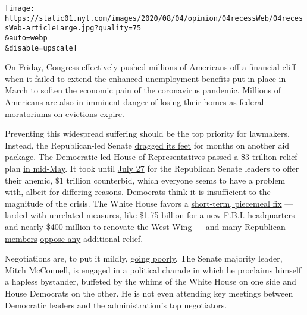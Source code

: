 \texttt{[image: https://static01.nyt.com/images/2020/08/04/opinion/04recessWeb/04recessWeb-articleLarge.jpg?quality=75\\\&auto=webp\\\&disable=upscale]}

On Friday, Congress effectively pushed millions of Americans off a
financial cliff when it failed to extend the enhanced unemployment
benefits put in place in March to soften the economic pain of the
coronavirus pandemic. Millions of Americans are also in imminent danger
of losing their homes as federal moratoriums on
\href{https://www.nytimes.com/2020/07/23/opinion/coronavirus-evictions-rent.html}{evictions
expire}.

Preventing this widespread suffering should be the top priority for
lawmakers. Instead, the Republican-led Senate
\href{https://www.nytimes.com/2020/07/30/opinion/mitch-mcconnell-coronavirus-economy.html}{dragged
its feet} for months on another aid package. The Democratic-led House of
Representatives passed a \$3 trillion relief plan
\href{https://www.nytimes.com/2020/05/15/us/politics/house-simulus-vote.html}{in
mid-May}. It took until
\href{https://www.nytimes.com/reuters/2020/07/27/us/politics/27reuters-health-coronavirus-usa-legislation-factbox.html}{July
27} for the Republican Senate leaders to offer their anemic, \$1
trillion counterbid, which everyone seems to have a problem with, albeit
for differing reasons. Democrats think it is insufficient to the
magnitude of the crisis. The White House favors a
\href{https://www.nytimes.com/2020/07/29/business/economy/virus-aid-trump.html}{short-term,
piecemeal fix} --- larded with unrelated measures, like \$1.75 billion
for a new F.B.I. headquarters and nearly \$400 million to
\href{https://abcnews.go.com/Politics/wireStory/administration-west-wing-remodel-money-virus-bill-72061451}{renovate
the West Wing} --- and
\href{https://www.nytimes.com/2020/07/28/us/politics/coronavirus-relief-bills-house-senate.html}{many
Republican members}
\href{https://www.forbes.com/sites/zackfriedman/2020/07/29/stimulus-package-republicans/\#4ec4dffa1164}{oppose
any} additional relief.

Negotiations are, to put it mildly,
\href{https://www.politico.com/news/2020/08/03/senate-faces-crucial-week-on-coronavirus-relief-talks-390907?nname=playbook\&nid=0000014f-1646-d88f-a1cf-5f46b7bd0000\&nrid=0000014e-f10f-dd93-ad7f-f90fe5eb0000\&nlid=630318}{going
poorly}. The Senate majority leader, Mitch McConnell, is engaged in a
political charade in which he proclaims himself a hapless bystander,
buffeted by the whims of the White House on one side and House Democrats
on the other. He is not even attending key meetings between Democratic
leaders and the administration's top negotiators.

